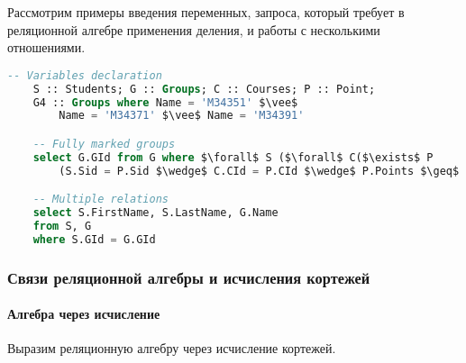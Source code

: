 Рассмотрим примеры введения переменных, запроса, который требует в реляционной алгебре применения
деления, и работы с несколькими отношениями.

\begin{lstlisting}[language=SQL, mathescape=true]
    -- Variables declaration
    S :: Students; G :: Groups; C :: Courses; P :: Point;
    G4 :: Groups where Name = 'M34351' $\vee$
        Name = 'M34371' $\vee$ Name = 'M34391'

    -- Fully marked groups
    select G.GId from G where $\forall$ S ($\forall$ C($\exists$ P
        (S.Sid = P.Sid $\wedge$ C.CId = P.CId $\wedge$ P.Points $\geq$ 60)))

    -- Multiple relations
    select S.FirstName, S.LastName, G.Name
    from S, G
    where S.GId = G.GId
\end{lstlisting}

\subsubsection{Связи реляционной алгебры и исчисления кортежей}

\paragraph{Алгебра через исчисление}

Выразим реляционную алгебру через исчисление кортежей.

